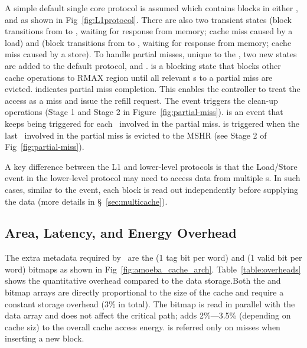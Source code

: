 \clearpage

A simple default single core protocol is assumed which contains blocks in either ,  and  as shown in Fig~\ref{fig:L1protocol}. There are also two transient states (block transitions from  to , waiting for  response from memory; cache miss caused by a load) and (block transitions from  to , waiting for  response from memory; cache miss caused by a store). To handle partial misses, unique to the \AC{}, two new states are added to the default protocol,  and .  is a blocking state that blocks other cache operations to RMAX region until all relevant \AB{}s to a partial miss are evicted.  indicates partial miss completion. This enables the controller to treat the access as a miss and issue the refill request. The  event triggers the clean-up operations (Stage 1 and Stage 2 in Figure~\ref{fig:partial-miss}).  is an event that keeps being triggered for each \AB\ involved in the partial miss.  is triggered when the last \AB\ involved in the partial miss is evicted to the MSHR (see Stage 2 of Fig~\ref{fig:partial-miss}).

A key difference between the L1 and lower-level protocols is that the Load/Store event in the lower-level protocol may need to access data from multiple \AB{}s. In such cases, similar to the  event, each block is read out independently before supplying the data (more details in \S~\ref{sec:multicache}).

\subsection{Area, Latency, and Energy Overhead}

The extra metadata required by \AC\ are the (1 tag bit per word) and (1 valid bit per word) bitmaps as shown in Fig~\ref{fig:amoeba_cache_arch}. Table~\ref{table:overheads} shows the quantitative overhead compared to the data storage.Both the  and  bitmap arrays are directly proportional to the size of the cache and require a constant storage overhead (3\% in total). The  bitmap is read in parallel with the data array and does not affect the critical path;  adds 2\%---3.5\% (depending on cache siz) to the overall cache access energy. is referred only on misses when inserting a new block.

